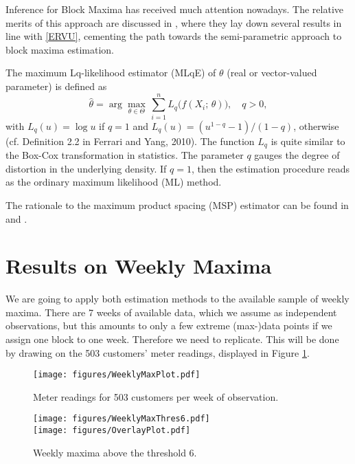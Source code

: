 \documentclass[10pt, a4paper, oneside]{article}
\newcommand{\sumab}[2]{\ensuremath{\sum\limits_{#1}^{#2}}}
\newcommand{\argmax}[1]{\ensuremath{\displaystyle {\arg\max_{#1}}}}
\begin{document}
Inference for Block Maxima has received much attention nowadays. The relative merits of this approach are discussed in \citet{FdeH:15}, where they lay down several results in line with \eqref{ERVU}, cementing the path towards the semi-parametric approach to block maxima estimation.


The maximum Lq-likelihood estimator (MLqE) of $\theta$ (real or vector-valued parameter) is defined as
\begin{equation*}
	\hat{\theta}= \argmax{\theta \in \Theta} \, \sumab{i=1}{n} L_q\bigl( f(X_i; \, \theta)\bigr), \quad q>0,
\end{equation*}
with $L_q(u)= \log u$ if $q=1$ and $L_q(u)= (u^{1-q}- 1)/(1-q)$, otherwise (cf. Definition 2.2 in Ferrari and Yang, 2010). The function $L_q$ is quite similar to the Box-Cox transformation in statistics. The parameter $q$ gauges the degree of distortion in the underlying density. If $q=1$, then the estimation procedure reads as the ordinary maximum likelihood (ML) method.

The rationale to the maximum product spacing (MSP) estimator can be found in \citet{ChengAmin:79} and \citet{Ranneby:84}.


\section{Results on Weekly Maxima}

We are going to apply both estimation methods to the available sample of weekly maxima. There are 7 weeks of available data, which we assume as independent observations, but this amounts to only a few extreme (max-)data points if we assign one block to one week. Therefore we need to replicate. This will be done by drawing on the 503 customers' meter readings, displayed in Figure \ref{Fig.WeeklyMax}. 

\begin{figure}
\begin{center}
\texttt{[image: figures/WeeklyMaxPlot.pdf]}
\caption{Meter readings for 503 customers per week of observation.} \label{Fig.WeeklyMax}
\end{center}
\end{figure}

\begin{figure}
\begin{center}
\texttt{[image: figures/WeeklyMaxThres6.pdf]}\\
\texttt{[image: figures/OverlayPlot.pdf]}
\caption{Weekly maxima above the threshold 6.} \label{Fig.WeekMaxThres}
\end{center}
\end{figure}
\end{document}
